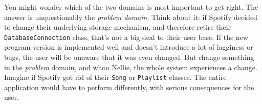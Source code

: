 You might wonder which of the two domains is most important to get right. The
answer is unquestionably the \textit{problem domain}. Think about it: if
Spotify decided to change their underlying storage mechanism, and therefore
retire their \texttt{DatabaseConnection} class, that's not a big deal to their
user base. If the new program version is implemented well and doesn't
introduce a lot of lagginess or bugs, the user will be unaware that it was
even changed. But change something in the \textit{problem} domain, and whoo
Nellie, the whole system experiences a change. Imagine if Spotify got rid of
their \texttt{Song} or \texttt{Playlist} classes. The entire application would
have to perform differently, with serious consequences for the user.


